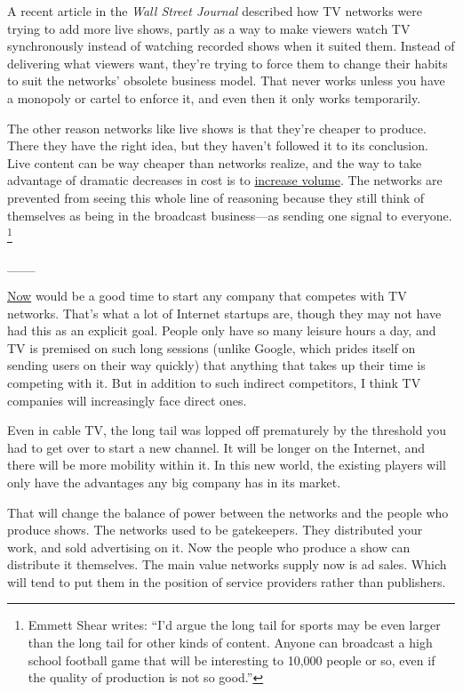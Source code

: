 \documentclass[12pt]{book}
\begin{document}
A recent article in the \emph{Wall Street Journal} described how TV
networks were trying to add more live shows, partly as a way to make
viewers watch TV synchronously instead of watching recorded shows when
it suited them. Instead of delivering what viewers want, they're trying
to force them to change their habits to suit the networks' obsolete
business model. That never works unless you have a monopoly or cartel to
enforce it, and even then it only works temporarily.

The other reason networks like live shows is that they're cheaper to
produce. There they have the right idea, but they haven't followed it to
its conclusion. Live content can be way cheaper than networks realize,
and the way to take advantage of dramatic decreases in cost is to
\href{http://justin.tv}{increase volume}. The networks are prevented
from seeing this whole line of reasoning because they still think of
themselves as being in the broadcast business---as sending one signal to
everyone. \footnote{Emmett Shear writes: ``I'd argue the long tail for sports may be
even larger than the long tail for other kinds of content. Anyone can
broadcast a high school football game that will be interesting to 10,000
people or so, even if the quality of production is not so good.''}

\_\_\_

\href{badeconomy.html}{Now} would be a good time to start any company
that competes with TV networks. That's what a lot of Internet startups
are, though they may not have had this as an explicit goal. People only
have so many leisure hours a day, and TV is premised on such long
sessions (unlike Google, which prides itself on sending users on their
way quickly) that anything that takes up their time is competing with
it. But in addition to such indirect competitors, I think TV companies
will increasingly face direct ones.

Even in cable TV, the long tail was lopped off prematurely by the
threshold you had to get over to start a new channel. It will be longer
on the Internet, and there will be more mobility within it. In this new
world, the existing players will only have the advantages any big
company has in its market.

That will change the balance of power between the networks and the
people who produce shows. The networks used to be gatekeepers. They
distributed your work, and sold advertising on it. Now the people who
produce a show can distribute it themselves. The main value networks
supply now is ad sales. Which will tend to put them in the position of
service providers rather than publishers.
\end{document}
